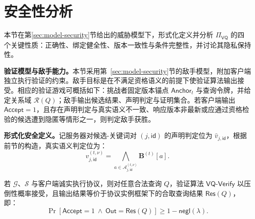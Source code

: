 \section{安全性分析}
\label{sec:vq-security}
本节在第\ref{sec:model-security}节给出的威胁模型下，形式化定义并分析 $\Pi_{\mathsf{VQ}}$ 的四个关键性质：正确性、绑定健全性、版本一致性与条件完整性，并讨论其隐私保持性。

\textbf{验证模型与敌手能力。}本节采用第~\ref{sec:model-security}节的敌手模型，附加客户端独立执行验证的约束。敌手目标是在不满足资格语义的前提下使验证算法输出接受。相应的验证游戏可概括如下：挑战者固定版本锚点 $\mathsf{Anchor}_t$ 与查询令牌，并给定关系域 $\mathcal{R}(Q)$；敌手输出候选结果、声明判定与证明集合。若客户端输出 $\mathsf{Accept}=1$，且存在声明判定与真实语义不一致、响应版本非最新或应通过资格检验的候选遭到隐匿等情形之一，则判定敌手获胜。

\textbf{形式化安全定义。}记服务器对候选-关键词对 $(j,\mathsf{id})$ 的声明判定位为 $\widehat{v}_{j,\mathsf{id}}$，根据前节的构造，真实语义判定位为：
\begin{equation}\label{eq:vq-judgment-bit-sec}
v_{j,\mathsf{id}}^{(t,\nu)}=\bigwedge_{a\in \mathcal{A}_{j,\mathsf{id}}^{(t,\nu)}} \mathbf{B}^{(t)}[a]\text{.}
\end{equation}

\begin{definition}[正确性]\label{def:vq-correctness}
若 $\mathcal{G}$、$\mathcal{S}$ 与客户端诚实执行协议，则对任意合法查询 $Q$，验证算法 $\mathsf{VQ\text{-}Verify}$ 以压倒性概率接受，且输出结果等价于协议实例框架下的合取查询结果 $\mathsf{Res}(Q)$，即：
\begin{equation}
\Pr\!\left[\mathsf{Accept}=1\ \wedge\ \mathsf{Out}=\mathsf{Res}(Q)\right]\ge 1-\mathsf{negl}(\lambda)\text{.}
\end{equation}
\end{definition}

